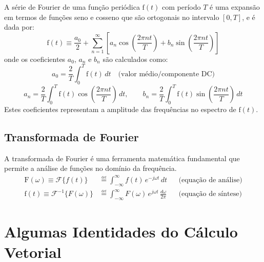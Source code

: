 A série de Fourier de uma função periódica $\mathrm{f}(t)$ com período $T$ é uma expansão em termos de funções seno e cosseno que são ortogonais no intervalo \([0, T]\), e é dada por:
$$
    \mathrm{f}(t) \equiv \frac{a_0}{2} + \sum_{n=1}^{\infty} \left[ a_n \cos\left(\frac{2\pi n t}{T}\right) + b_n \sin\left(\frac{2\pi n t}{T}\right) \right]
$$
onde os coeficientes $a_0$, $a_n$ e $b_n$ são calculados como:
$$
    a_0 = \frac{2}{T} \int_{0}^{T} \mathrm{f}(t) \, dt 
    \quad \text{(valor médio/componente DC)}
$$
$$
    a_n = \frac{2}{T} \int_{0}^{T} \mathrm{f}(t) \cos\left(\frac{2\pi n t}{T}\right) \, dt,
    \qquad
    b_n = \frac{2}{T} \int_{0}^{T} \mathrm{f}(t) \sin\left(\frac{2\pi n t}{T}\right) \, dt
$$
Estes coeficientes representam a amplitude das frequências no espectro de $\mathrm{f}(t)$.

\subsection*{Transformada de Fourier}

A transformada de Fourier é uma ferramenta matemática fundamental que permite a análise de funções no domínio da frequência.
$$
    \begin{aligned}
        \mathrm{F}(\omega) \equiv \mathcal{F}\{ f(t) \}
        &\overset{\underset{\mathrm{def}}{}}{=}
        \int_{-\infty}^{\infty} f(t)\, e^{-j\omega t} \, dt
        & &\text{(equação de análise)}
        \\
        \mathrm{f}(t) \equiv \mathcal{F}^{-1}\{ F(\omega ) \}
        &\overset{\underset{\mathrm{def}}{}}{=}
        \int_{-\infty}^{\infty} F(\omega)\, e^{j\omega t} \, \frac{d\omega}{2\pi}
        & &\text{(equação de síntese)}
    \end{aligned}
$$

\section*{Algumas Identidades do Cálculo Vetorial}

